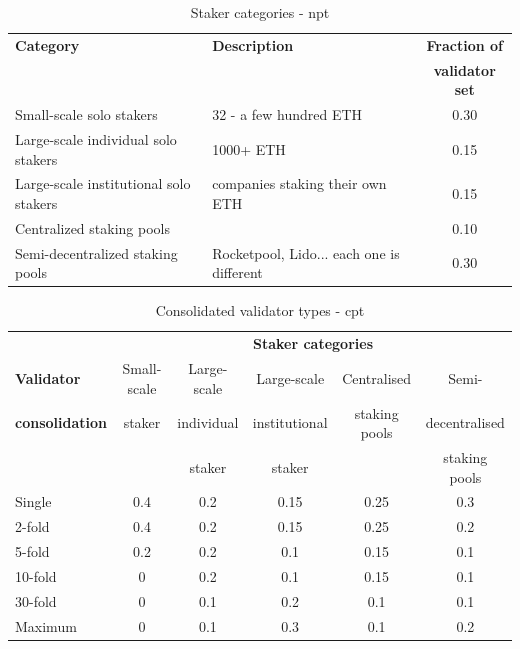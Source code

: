  \begin{table}[htp]
\caption{Staker categories - \gls{npt}}
\begin{center}
\begin{tabular}{|l|l|c|}
\hline
\textbf{Category} & \textbf{Description} & \textbf{Fraction of} \\
 & & \textbf{validator set} \\
 \hline
Small-scale solo stakers & 32 - a few hundred ETH & 0.30 \\
Large-scale individual solo stakers & 1000+ ETH & 0.15 \\
Large-scale institutional solo stakers & companies staking their own ETH & 0.15 \\
Centralized staking pools & & 0.10 \\
Semi-decentralized staking pools & Rocketpool, Lido... each one is different & 0.30 \\
\hline
\end{tabular}
\end{center}
\label{tbl:stakers}
\end{table}%

\begin{table}[htp]
\caption{Consolidated validator types - \gls{cpt}}
\begin{center}
\begin{tabular}{|l|c|c|c|c|c|}
\hline
& \multicolumn{5}{c|}{\textbf{Staker categories}} \\
\cline{2-6}
\textbf{Validator}       & Small-scale & Large-scale & Large-scale & Centralised  & Semi- \\
\textbf{consolidation} & staker         & individual    & institutional  & staking pools& decentralised \\
                                  &                    & staker          & staker         &                      & staking pools \\
\hline
 Single  & 0.4	& 0.2	 & 0.15 & 0.25 & 0.3 \\
 2-fold  & 0.4 & 0.2 & 0.15 & 0.25 & 0.2 \\
 5-fold  & 0.2	 & 0.2 & 0.1 & 0.15 & 0.1 \\
 10-fold & 0 & 0.2 & 0.1 & 0.15 & 0.1 \\
 30-fold  & 0 & 0.1 & 0.2 & 0.1 & 0.1 \\
 Maximum & 0 & 0.1 & 0.3 & 0.1 & 0.2 \\
\hline
\end{tabular}
\end{center}
\label{tbl:consolidation}
\end{table}%

